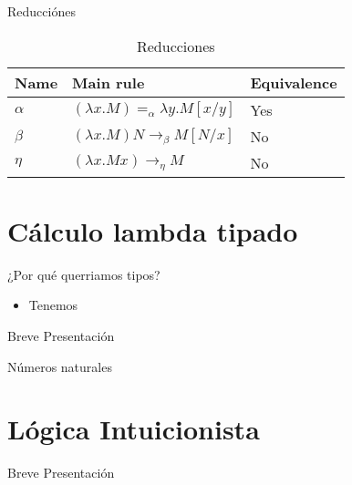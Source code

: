 \documentclass[usenames,dvipsnames]{beamer}
\begin{document}
\begin{frame}{Reducciónes}
  
\begin{table}[h]
  \begin{center}
    \begin{tabular}{|l|l|l|}
      \hline
      Name & Main rule & Equivalence \\
            \hline
      $\alpha$ & $ (\lambda x. M) =_\alpha \lambda y. M[x/y]$& Yes\\
      $\beta$ & $(\lambda x.M)N \to_\beta M[N/x]$& No\\
      $\eta$ & ${\displaystyle (\lambda x.Mx) \to_\eta M }$& No\\
      \hline
    \end{tabular}
  \end{center}
  \caption{\label{tab:reductions}Reducciones}
\end{table}

\end{frame}

\section{Cálculo lambda tipado}
\begin{frame}{¿Por qué querriamos tipos?}
  \begin{itemize}
  \item Tenemos 
  \end{itemize}
  
\end{frame}


\begin{frame}{Breve Presentación}

\end{frame}


\begin{frame}
  
\end{frame}


\begin{frame}{Números naturales}

\end{frame}



\section{Lógica Intuicionista}

\begin{frame}{Breve Presentación}

\end{frame}
\end{document}
